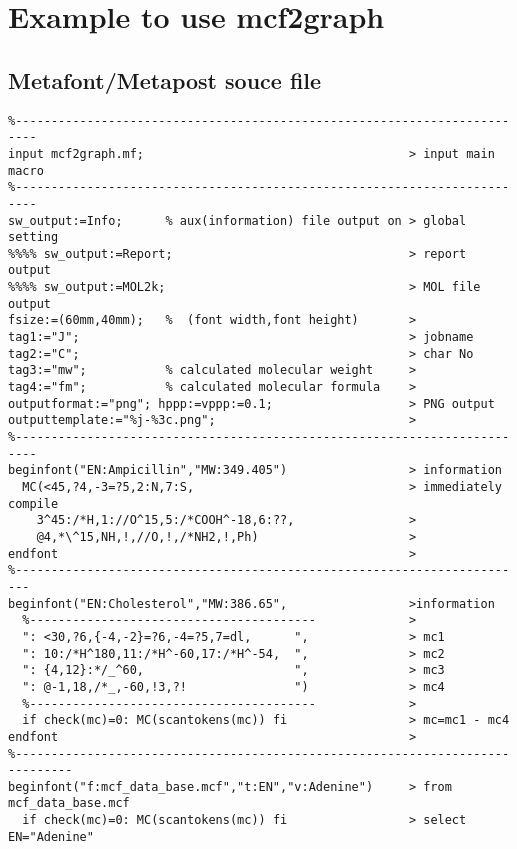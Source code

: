 \documentclass[a4paper]{article}
\begin{document}
\section{Example to use mcf2graph}
\subsection{Metafont/Metapost souce file}
%
%
%
%
\begin{verbatim}
%-------------------------------------------------------------------------
input mcf2graph.mf;                                     > input main macro
%-------------------------------------------------------------------------
sw_output:=Info;      % aux(information) file output on > global setting
%%%% sw_output:=Report;                                 > report output
%%%% sw_output:=MOL2k;                                  > MOL file output
fsize:=(60mm,40mm);   %  (font width,font height)       >
tag1:="J";                                              > jobname
tag2:="C";                                              > char No
tag3:="mw";           % calculated molecular weight     > 
tag4:="fm";           % calculated molecular formula    >
outputformat:="png"; hppp:=vppp:=0.1;                   > PNG output
outputtemplate:="%j-%3c.png";                           >
%-------------------------------------------------------------------------
beginfont("EN:Ampicillin","MW:349.405")                 > information
  MC(<45,?4,-3=?5,2:N,7:S,                              > immediately compile
    3^45:/*H,1://O^15,5:/*COOH^-18,6:??,                >
    @4,*\^15,NH,!,//O,!,/*NH2,!,Ph)                     >
endfont                                                 >
%------------------------------------------------------------------------
beginfont("EN:Cholesterol","MW:386.65",                 >information
  %----------------------------------------             >
  ": <30,?6,{-4,-2}=?6,-4=?5,7=dl,      ",              > mc1
  ": 10:/*H^180,11:/*H^-60,17:/*H^-54,  ",              > mc2
  ": {4,12}:*/_^60,                     ",              > mc3
  ": @-1,18,/*_,-60,!3,?!               ")              > mc4
  %----------------------------------------             >
  if check(mc)=0: MC(scantokens(mc)) fi                 > mc=mc1 - mc4
endfont                                                 >
%------------------------------------------------------------------------------
beginfont("f:mcf_data_base.mcf","t:EN","v:Adenine")     > from mcf_data_base.mcf
  if check(mc)=0: MC(scantokens(mc)) fi                 > select EN="Adenine"

\end{verbatim}
\end{document}
